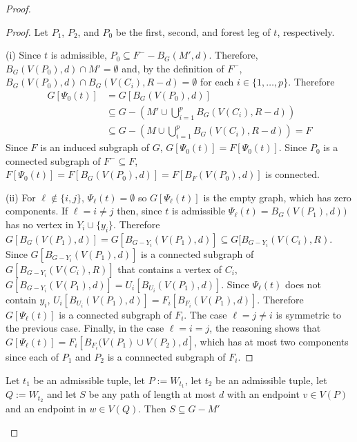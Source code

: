 \documentclass{patmorin}
\newcommand{\pat}[1]{\textcolor{Blue}{Pat: #1}}
\newcommand{\piotr}[1]{\textcolor{red}{Piotr: #1}}
\begin{document}
\begin{proof}
\begin{clm}
\begin{compactenum}[(i)]
\end{compactenum}
\end{clm}

\begin{proof}
    Let $P_1$, $P_2$, and $P_0$ be the first, second, and forest leg of $t$, respectively.  
    
    (i) Since $t$ is admissible, $P_0\subseteq
    F^--B_G(M',d)$. 
    Therefore, $B_G(V(P_0),d)\cap M'=\emptyset$ and, by the definition of $F^-$, $B_G(V(P_0),d)\cap B_G(V(C_i),R-d)=\emptyset$ for each $i\in\{1,\ldots,p\}$.  Therefore 
    \begin{align*}
      G[\Psi_0(t)] & =  G[B_G(V(P_0),d)] \\
       & \subseteq G-\left(M'\cup \bigcup_{i=1}^p B_G(V(C_i),R-d)\right) \\
       & \subseteq G-\left(M\cup \bigcup_{i=1}^p B_G(V(C_i),R-d)\right) = F
    \end{align*}
    Since $F$ is an induced subgraph of $G$, $G[\Psi_0(t)] = F[\Psi_0(t)]$.  Since $P_0$ is a connected subgraph of $F^-\subseteq F$, 
    $F[\Psi_0(t)]=F[B_G(V(P_0),d)]=F[B_F(V(P_0),d)]$ is connected.

    (ii) For $\ell\not\in\{i,j\}$, $\Psi_\ell(t)=\emptyset$ so $G[\Psi_\ell(t)]$ is the empty graph, which has zero components.  If $\ell=i\neq j$ then, since $t$ is admissible $\Psi_\ell(t)=B_G(V(P_1),d))$ has no vertex in $Y_i\cup\{y_i\}$.  Therefore $G[B_G(V(P_1),d)]= G[B_{G-Y_i}(V(P_1),d)]\subseteq G[B_{G-Y_i}(V(C_i),R)$.  Since $G[B_{G-Y_i}(V(P_1),d)]$ is a connected subgraph of $G[B_{G-Y_i}(V(C_i),R)]$ that contains a vertex of $C_i$, $G[B_{G-Y_i}(V(P_1),d)]= U_i[B_{U_i}(V(P_1),d)]$.  Since $\Psi_\ell(t)$ does not contain $y_i$, $U_i[B_{U_i}(V(P_1),d)]= F_i[B_{F_i}(V(P_1),d)]$.  Therefore $G[\Psi_\ell(t)]$ is a connected subgraph of $F_i$.  The case $\ell=j\neq i$ is symmetric to the previous case.  Finally, in the case $\ell=i=j$, the reasoning shows that $G[\Psi_\ell(t)]=F_i[B_{F_i}(V(P_1)\cup V(P_2),d]$, which has at most two components since each of $P_1$ and $P_2$ is a connnected subgraph of $F_i$.
\end{proof}

\begin{clm}\label{s_path}
  Let $t_1$ be an admissible tuple, let $P:=W_{t_1}$, let $t_2$ be an admissible tuple, let $Q:=W_{t_2}$ and let $S$ be any path of length at most $d$ with an endpoint $v\in V(P)$ and an endpoint in $w\in V(Q)$. Then $S\subseteq G-M'$
\end{clm}


\end{proof}
\end{document}
